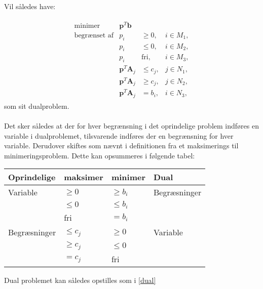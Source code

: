 Vil således have:


\begin{align*}
\begin{array}{lrll}
\text{minimer}		&\textbf{p}^T\textbf{b}	&			&\\
\text{begrænset af}	&p_i					&\geq 0,	&i \in M_1,\\
					&p_i					&\leq 0,	&i \in M_2,\\
					&p_i					&\text{fri},	&i \in M_3,\\
					&\textbf{p}^T\textbf{A}_j	&\leq c_j,	&j \in N_1,\\
					&\textbf{p}^T\textbf{A}_j	&\geq c_j,	&j \in N_2,\\
					&\textbf{p}^T\textbf{A}_j	& = b_i,	&i \in N_3,
\end{array}
\end{align*}
%
som sit dualproblem.
\\\\
%
Det sker således at der for hver begrænsning i det oprindelige problem indføres en variable i dualproblemet, tilsvarende indføres der en begrænsning for hver variable. 
Derudover skiftes som nævnt i definitionen fra et maksimerings til minimeringsproblem. 
Dette kan opsummeres i følgende tabel: \\
\begin{table}[H]
\begin{center}
\begin{tabular}{llll}
Oprindelige  & maksimer   & minimer    & Dual         \\
\hline
Variable     & $\geq 0$   & $\geq b_i$ & Begræsninger \\
             & $\leq 0$   & $\leq b_i$ &              \\
             & fri        & $=b_i$     &              \\
\hline
Begræsninger & $\leq c_j$ & $\geq 0$   & Variable     \\
             & $\geq c_j$ & $\leq 0$   &              \\
             & $=c_j$     & fri        &             
\end{tabular}
\end{center}
\end{table}
\noindent
%
Dual problemet kan således opstilles som i \ref{dual} \\
%
